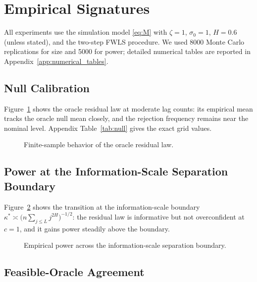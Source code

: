 \section{Empirical Signatures}
\label{sec:sims}

All experiments use the simulation model \eqref{eq:M} with $\zeta = 1$,
$\sigma_0 = 1$, $H = 0.6$ (unless stated), and the two-step FWLS procedure.
We used 8000 Monte Carlo replications for size and 5000 for power; detailed
numerical tables are reported in Appendix~\ref{app:numerical_tables}.

\subsection{Null Calibration}

Figure~\ref{fig:null-calibration} shows the oracle residual law at moderate lag
counts: its empirical mean tracks the oracle null mean closely, and the
rejection frequency remains near the nominal level. Appendix Table~\ref{tab:null}
gives the exact grid values.

\begin{figure}[!htbp]
\centering
{}
\caption{Finite-sample behavior of the oracle residual law.}
\label{fig:null-calibration}
\end{figure}
\FloatBarrier

\subsection{Power at the Information-Scale Separation Boundary}

Figure~\ref{fig:power-boundary} shows the transition at the information-scale
boundary $\kappa^* \asymp \bigl(n\sum_{j \leq L} j^{2H}\bigr)^{-1/2}$:
the residual law is informative but not overconfident at $c=1$, and it gains
power steadily above the boundary.

\begin{figure}[!htbp]
\centering
{}
\caption{Empirical power across the information-scale separation boundary.}
\label{fig:power-boundary}
\end{figure}
\FloatBarrier

\subsection{Feasible-Oracle Agreement}

